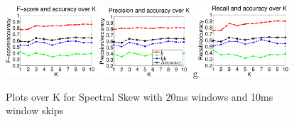 	
\begin{figure}


	\centering\includegraphics[width=0.3\textwidth]{tex/appendices/test/sskew2010FP.png}
	\centering\includegraphics[width=0.3\textwidth]{tex/appendices/test/sskew2010_P.png}	g\includegraphics[width=0.3\textwidth]{tex/appendices/test/sskew2010_R.png}
	
	\caption{Plots over K for Spectral Skew with 20ms windows and 10ms window skips}
\end{figure}

